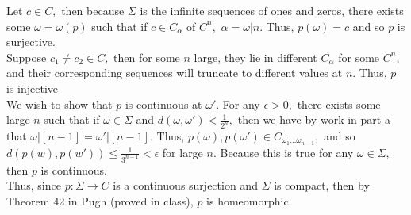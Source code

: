 \documentclass[11pt]{article}
\begin{document}
\begin{enumerate}
\begin{solution}
        Let $c\in C,$ then because $\Sigma$ is the infinite sequences of ones and zeros, there exists some $\omega = \omega(p)$ such that if $c\in C_\alpha$ of $C^n,$ $\alpha = \omega | n.$ Thus, $p(\omega) = c$ and so $p$ is surjective.\\

        Suppose $c_1 \neq c_2 \in C,$ then for some $n$ large, they lie in different $C_\alpha$ for some $C^n,$ and their corresponding sequences will truncate to different values at $n.$ Thus, $p$ is injective\\

        We wish to show that $p$ is continuous at $\omega'.$ For any $\epsilon>0,$ there exists some large $n$ such that if $\omega \in \Sigma$ and $d(\omega, \omega')< \frac{1}{2^n},$ then we have by work in part a that $\omega|{[n-1]} = \omega'|{[n-1]}.$ Thus, $p(\omega),p(\omega')\in C_{\omega_1\dots\omega_{n-1}},$ and so $d(p(w), p(w'))\leq \frac{1}{3^{n-1}}<\epsilon$ for large $n.$ Because this is true for any $\omega \in \Sigma,$ then $p$ is continuous.\\

        Thus, since $p:\Sigma \to C$ is a continuous surjection and $\Sigma$ is compact, then by Theorem 42 in Pugh (proved in class), $p$ is homeomorphic.
    \end{solution}
\end{enumerate}
\end{document}
